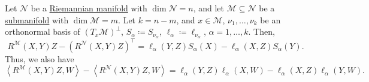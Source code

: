 \begin{theorem}\label{thm:Gauss-equations}
	Let \(\mathcal{N} \) be a \hyperref[def:Riemannian-manifold]{Riemannian manifold} with \(\dim \mathcal{N} = n\), and let \(\mathcal{M} \subseteq \mathcal{N} \) be a \hyperref[def:submanifold]{submanifold} with \(\dim \mathcal{M} = m\). Let \(k = n - m\), and \(x\in \mathcal{M} \), \(\nu _1, \dots , \nu _k\) be an orthonormal basis of \((T_x \mathcal{M} )^{\perp} \), \(S_\alpha \coloneq S_{\nu _\alpha }\), \(\ell _\alpha \coloneqq \ell _{\nu _\alpha }\), \(\alpha = 1, \dots , k\). Then,
	\[
		R^{\mathcal{M}}(X, Y)Z - \left( R^{\mathcal{N} } (X, Y)Z \right) ^{\top}
		= \ell _\alpha (Y, Z)S_\alpha (X) - \ell _\alpha (X, Z)S_{\alpha }(Y).
	\]
	Thus, we also have
	\[
		\left\langle R^{\mathcal{M} }(X, Y)Z, W \right\rangle - \left\langle R^{\mathcal{N} }(X, Y)Z, W \right\rangle
		= \ell _\alpha (Y, Z) \ell _\alpha (X, W) - \ell _\alpha (X, Z) \ell _\alpha (Y, W).
	\]
\end{theorem}
